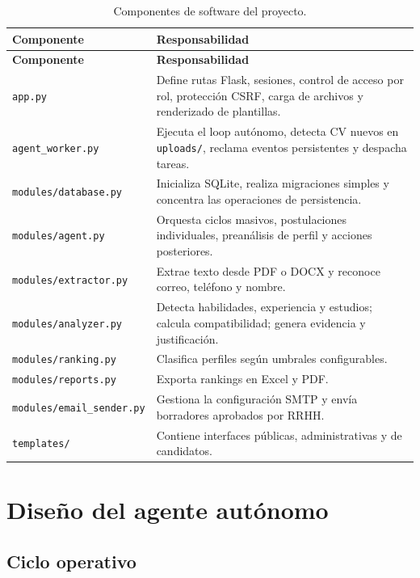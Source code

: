 \documentclass[12pt,a4paper]{article}
\begin{document}
\begin{longtable}{>{\raggedright\arraybackslash}p{3.5cm}>{\raggedright\arraybackslash}p{10.7cm}}
\caption{Componentes de software del proyecto.}\\
\toprule
\textbf{Componente} & \textbf{Responsabilidad} \\
\midrule
\endfirsthead
\toprule
\textbf{Componente} & \textbf{Responsabilidad} \\
\midrule
\endhead
\texttt{app.py} & Define rutas Flask, sesiones, control de acceso por rol, protección CSRF, carga de archivos y renderizado de plantillas. \\
\texttt{agent\_worker.py} & Ejecuta el loop autónomo, detecta CV nuevos en \texttt{uploads/}, reclama eventos persistentes y despacha tareas. \\
\texttt{modules/database.py} & Inicializa SQLite, realiza migraciones simples y concentra las operaciones de persistencia. \\
\texttt{modules/agent.py} & Orquesta ciclos masivos, postulaciones individuales, preanálisis de perfil y acciones posteriores. \\
\texttt{modules/extractor.py} & Extrae texto desde PDF o DOCX y reconoce correo, teléfono y nombre. \\
\texttt{modules/analyzer.py} & Detecta habilidades, experiencia y estudios; calcula compatibilidad; genera evidencia y justificación. \\
\texttt{modules/ranking.py} & Clasifica perfiles según umbrales configurables. \\
\texttt{modules/reports.py} & Exporta rankings en Excel y PDF. \\
\texttt{modules/email\_sender.py} & Gestiona la configuración SMTP y envía borradores aprobados por RRHH. \\
\texttt{templates/} & Contiene interfaces públicas, administrativas y de candidatos. \\
\bottomrule
\end{longtable}

\section{Diseño del agente autónomo}

\subsection{Ciclo operativo}
\end{document}
